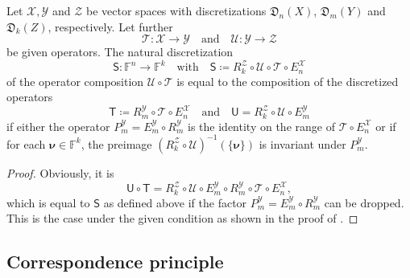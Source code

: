 \documentclass[a4paper]{paper}
\newcommand*{\SPC}[1]{{\ensuremath{\mathscr{#1}}}}
\newcommand*{\SPCX}{\SPC{X}}
\newcommand*{\SPCY}{\SPC{Y}}
\newcommand*{\SPCZ}{\SPC{Z}}
\newcommand{\FIELD}{{\ensuremath{\mathbb{F}}}}
\newcommand*{\Fn}{{\ensuremath{\FIELD^n}}}
\newcommand*{\Fk}{{\ensuremath{\FIELD^k}}}
\newcommand*{\OP}[1]{{\ensuremath{\mathcal{#1}}}}
\newcommand*{\OPT}{\OP{T}}
\newcommand*{\OPU}{\OP{U}}
\newcommand{\DISCOP}[1]{{\ensuremath{\mathsf{#1}}}}
\newcommand*{\DISCOPT}{\DISCOP{T}}
\newcommand*{\DISCOPU}{\DISCOP{U}}
\newcommand*{\EXT}[2]{\ensuremath{E_{#1}^{#2}}}
\newcommand*{\REST}[2]{\ensuremath{R_{#1}^{#2}}}
\newcommand*{\PROJ}[2]{\ensuremath{P_{#1}^{#2}}}
\newcommand*{\RmY}{{\ensuremath{\REST{m}{\SPC{Y}}}}}
\newcommand*{\EnX}{{\ensuremath{\EXT{n}{\SPC{X}}}}}
\newcommand*{\EmY}{{\ensuremath{\EXT{m}{\SPC{Y}}}}}
\newcommand*{\PmY}{{\ensuremath{\PROJ{m}{\SPCY}}}}
\newcommand*{\DISCR}[2]{{\ensuremath{\mathfrak{D}_{#2}(#1)}}}
\newcommand*{\DISCRnX}{\DISCR{X}{n}}
\newcommand*{\DISCRmY}{\DISCR{Y}{m}}
\newcommand*{\DISCRkZ}{\DISCR{Z}{k}}
\DeclareMathOperator{\DEFEQ}{{\coloneqq}}
\newcommand{\vnu}{\boldsymbol{\nu}}
\begin{document}
\begin{lemma}
 \label{lemma:discr:operator:op_comp:natural_is_comp}
 Let $\SPCX, \SPCY$ and $\SPCZ$ be vector spaces with discretizations $\DISCRnX$, 
 $\DISCRmY$ and $\DISCRkZ$, respectively. Let further
 \begin{equation*}
  \OPT \colon \SPCX \to \SPCY \quad \text{and} \quad \OPU \colon \SPCY \to \SPCZ
 \end{equation*}
 be given operators. The natural discretization
 \begin{equation*}
  \DISCOP{S}\colon \Fn \to \Fk 
  \quad \text{with} \quad
  \DISCOP{S} \DEFEQ  \REST{k}{\SPCZ} \circ \OPU \circ \OPT \circ \EnX
 \end{equation*}
 of the operator composition $\OPU \circ \OPT$ is equal to the composition of the discretized operators
 \begin{equation*}
  \DISCOPT \DEFEQ  \RmY \circ \OPT \circ \EnX
  \quad \text{and} \quad
  \DISCOPU = \REST{k}{\SPCZ} \circ \OPU \circ \EmY
 \end{equation*}
 if either the operator $\PmY = \EmY \circ \RmY$ is the identity on the range of $\OPT \circ \EnX$ or if for each 
 $\vnu \in \Fk$, the preimage $(\REST{k}{\SPCZ} \circ \OPU)^{-1}(\{\vnu\})$ is invariant under 
 $\PmY$.
\end{lemma}
\vspace{1em}


\begin{proof}
 Obviously, it is
 \begin{equation*}
  \DISCOPU \circ \DISCOPT = \REST{k}{\SPCZ} \circ \OPU \circ \EmY \circ \RmY \circ \OPT \circ \EnX,
 \end{equation*}
 which is equal to $\DISCOP{S}$ as defined above if the factor $\PmY = \EmY \circ \RmY$ can be dropped. This is the 
 case under the given condition as shown in the proof of .
\end{proof}



\subsection{Correspondence principle}
\label{subsec:discr:corresp}
\end{document}
